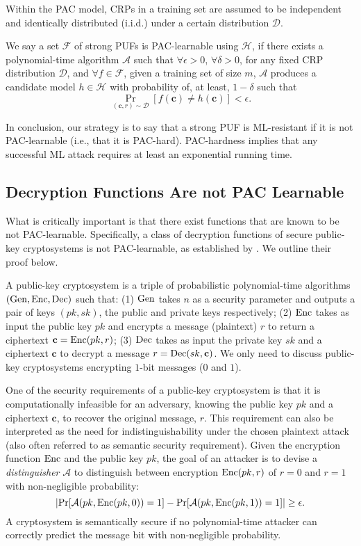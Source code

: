 Within the PAC model, CRPs in a training set are assumed to be independent and identically distributed (i.i.d.) under a certain distribution $\mathcal{D}$.

We say a set $\mathcal{F}$ of strong PUFs is PAC-learnable using $\mathcal{H}$, if there exists a polynomial-time algorithm $\mathcal{A}$ such that $\forall \epsilon > 0$, $\forall \delta >0$, for any fixed CRP distribution $\mathcal{D}$, and $\forall f\in\mathcal{F}$, given a training set of size $m$, $\mathcal{A}$ produces a candidate model $h\in\mathcal{H}$ with probability of, at least, $1-\delta$ such that
\begin{equation*}
\Pr_{(\mathbf{c},r)\sim\mathcal{D}}[f(\mathbf{c})\neq h(\mathbf{c})] < \epsilon.
\end{equation*}

In conclusion, our strategy is to say that a strong PUF is ML-resistant if it is not PAC-learnable (i.e., that it is PAC-hard). 
PAC-hardness implies that any successful ML attack requires at least an exponential running time. 

\subsection{Decryption Functions Are not PAC Learnable}
What is critically important is that there exist functions that are known to be not PAC-learnable. 
Specifically, a class of decryption functions of secure public-key cryptosystems is not PAC-learnable, as established by \cite{kearns1994cryptographic,klivans2006cryptographic}. 
We outline their proof below.

A public-key cryptosystem is a triple of probabilistic polynomial-time algorithms $(\Gen,\Enc,\Dec)$ such that:
(1) $\Gen$ takes $n$ as a security parameter and outputs a pair of keys $(pk,sk)$, the public and private keys respectively;
(2) $\Enc$ takes as input the public key $pk$ and encrypts a message (plaintext) $r$ to return a ciphertext $\mathbf{c} = \Enc(pk,r)$;
(3) $\Dec$ takes as input the private key $sk$ and a ciphertext $\mathbf{c}$ to decrypt a message $r = \Dec(sk,\mathbf{c})$.
We only need to discuss public-key cryptosystems encrypting $1$-bit messages ($0$ and $1$).

One of the security requirements of a public-key cryptosystem is that it is computationally infeasible for an adversary, knowing the public key $pk$ and a ciphertext $\mathbf{c}$, to recover the original message, $r$. 
This requirement can also be interpreted as the need for indistinguishability under the chosen plaintext attack (also often referred to as semantic security requirement). %
Given the encryption function $\Enc$ and the public key $pk$, the goal of an attacker is to devise a \emph{distinguisher} $\mathcal{A}$ to distinguish between encryption $\Enc(pk,r)$ of $r=0$ and $r=1$ with non-negligible probability:
\begin{equation*}
\abs{\Pr[\mathcal{A}(pk,\Enc(pk,0))=1] - \Pr[\mathcal{A}(pk,\Enc(pk,1))=1]}\geq \epsilon.
\end{equation*}
A cryptosystem is semantically secure if no polynomial-time attacker can correctly predict the message bit with non-negligible probability.

